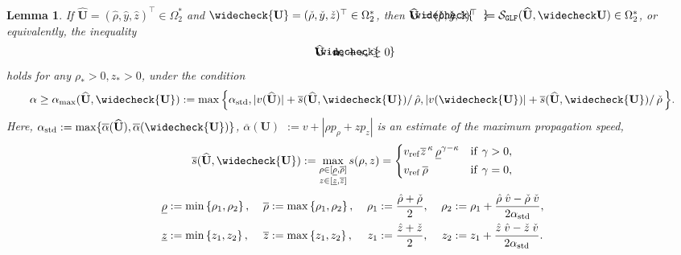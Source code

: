 \documentclass[times,final]{elsarticle}
\newtheorem{lemma}[theorem]{Lemma}
\numberwithin{equation}{section}
\theoremstyle{definition}
\theoremstyle{remark}
\newcommand{\BU}{\mathbf{U}}
\newcommand{\hBU}{\widehat{\BU}}
\newcommand{\cBU}{\widecheck{\BU}}
\newcommand{\hcBU}{
	\mathrlap{
		\raisebox{0.6 pt}{$\widecheck{\phantom{\mathbf{U}}}$}
	}
	\mathrlap{
		\raisebox{-0.6 pt}{$\widehat{\phantom{\mathbf{U}}}$}
	}
	\mathbf{U}
}
\newcommand{\hcr}{
	\mathrlap{
		\raisebox{0.5 pt}{$\check{\phantom{\rho}}$}
	}
	\mathrlap{
		\raisebox{-0.5 pt}{$\hat{\phantom{\rho}}$}
	}
	\rho
}
\newcommand{\hcy}{
	\mathrlap{
		\raisebox{0.5 pt}{$\check{\phantom{y}}$}
	}
	\mathrlap{
		\raisebox{-0.5 pt}{$\hat{\phantom{y}}$}
	}
	y
}
\newcommand{\hcz}{
	\mathrlap{
		\raisebox{0.5 pt}{$\check{\phantom{z}}$}
	}
	\mathrlap{
		\raisebox{-0.5 pt}{$\hat{\phantom{z}}$}
	}
	z
}
\begin{document}
\begin{lemma}\label{L2}
	If  $\hBU = (\hat{\rho},\hat{y},\hat{z})^\top \in \Omega_2^*$ 
	and $\cBU = (\check{\rho},\check{y},\check{z})^\top \in \Omega_2^*$, then 
	$\hcBU = (\hcr,\hcy,\hcz)^\top$ $:= \mathcal{S}_{\tt GLF}(\hBU,\widecheck\BU)	\in \Omega^*_2	$,
	or equivalently, the inequality
	\begin{equation}\label{eq:656}
		\hcBU \cdot \mathbf{n}_* + s_* \geq 0
	\end{equation}
	holds for any $\rho_* > 0, z_* > 0$, under the condition
	\begin{equation}\label{eq:674}
		\alpha \geq 
		\alpha_{\max}(\hBU,\widecheck{\BU})
		:=
		\max
		\Big\{ 
		\alpha_{\rm std}
		,
		|v(\hBU)|+\overline{s}(\hBU,\widecheck{\BU})/\,\hat{\rho}
		,
		|v(\widecheck{\BU})|+\overline{s}(\hBU,\widecheck{\BU})/\,\check{\rho}\,
		\Big\}.
	\end{equation}
	Here, 
	$\alpha_{\rm std} := \max \{ \overline\alpha(\hBU), \overline\alpha(\widecheck{\BU})\}$, $\overline \alpha(\BU)$ $:= v + |\rho p_{\rho}+z p_z|$ is an estimate of the maximum propagation speed,
	\begin{equation}\label{eq:686}
		\overline{s}(\hBU,\widecheck{\BU})
		:=
		\max_
		{\substack{
				\rho \in [\underline{\rho},\overline{\rho}]
				\\
				z \in [\underline{z},\overline{z}]
			}
		}
		s(\rho,z)
		=
		\begin{dcases}
			v_{\rm ref}
			\overline{z}^{\,\kappa}\,
			\underline{\rho}^{\gamma-\kappa}
			&
			{\rm if}~ \gamma > 0,
			\\
			v_{\rm ref} \, \overline\rho 
			&
			{\rm if}~ \gamma = 0,
		\end{dcases}
	\end{equation}
	\begin{align*}
		\underline{\rho} &:=\min \left\{{\rho}_1,{\rho}_2\right\},&
		\;
		\overline{\rho}  &:= \max	\left\{{\rho}_1,{\rho}_2\right\},&
		\;
		{\rho}_1 &:= \frac{\hat{\rho}+\check{\rho}}{2},&
		\;
		{\rho}_2 &:= {\rho}_1 + \frac{\hat{\rho}\;\hat{v} - \check{\rho}\;\check{v}}{2 \alpha_{\rm std}},
		\\
		\underline{z} &:= \min \left\{z_1,{z}_2\right\},&
		\;
		\overline{z} &:= \max \left\{{z}_1,{z}_2\right\},&
		\;
		{z}_1 &:= \frac{\hat{z}+\check{z} }{2},&
		\;
		{z}_2 &:= z_1 + \frac{\hat{z}\;\hat{v} - \check{z}\;\check{v}}{2 \alpha_{\rm std}}.
	\end{align*}
\end{lemma}
\end{document}
